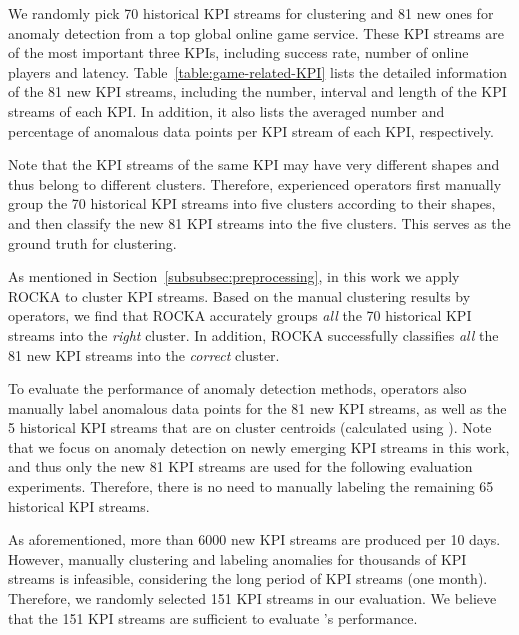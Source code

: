 We randomly pick 70 historical KPI streams for clustering and 81 new ones for anomaly detection from a top global online game service.
These KPI streams are of the most important three KPIs, including success rate, number of online players and latency.
Table~\ref{table:game-related-KPI} lists the detailed information of the 81 new KPI streams, including the number, interval and length of the KPI streams of each KPI. 
In addition, it also lists the averaged number and percentage of anomalous data points per KPI stream of each KPI, respectively. 

Note that the KPI streams of the same KPI may have very different shapes and thus belong to different clusters.
Therefore, experienced operators first manually group the 70 historical KPI streams into five clusters according to their shapes, and then classify the new 81 KPI streams into the five clusters.
This serves as the ground truth for clustering.

As mentioned in Section~\ref{subsubsec:preprocessing}, in this work we apply ROCKA to cluster KPI streams.
Based on the manual clustering results by operators, we find that ROCKA accurately groups \emph{all} the 70 historical KPI streams into the \emph{right} cluster.
In addition, ROCKA successfully classifies \emph{all} the 81 new KPI streams into the \emph{correct} cluster.

To evaluate the performance of anomaly detection methods, operators also manually label anomalous data points for the 81 new KPI streams, as well as the 5 historical KPI streams that are on cluster centroids (calculated using \ROCKA{}).
Note that we focus on anomaly detection on newly emerging KPI streams in this work, and thus
only the new 81 KPI streams are used for the following evaluation experiments.
Therefore, there is no need to manually labeling the remaining 65 historical KPI streams.

As aforementioned, more than 6000 new KPI streams are produced per 10 days.
However, manually clustering and labeling anomalies for thousands of KPI streams is infeasible, considering the long period of KPI streams (one month).
Therefore, we randomly selected 151 KPI streams in our evaluation.
We believe that the 151 KPI streams are sufficient to evaluate \name{}'s performance.


